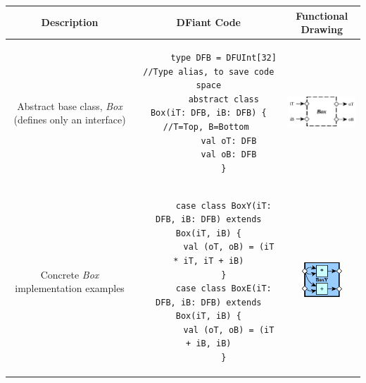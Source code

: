 \begin{table}[t]
  \label{tbl:Box}
  \begin{tabular}{|c|c|c|}
    \hline 
    \textbf{Description} & \textbf{DFiant Code} & \textbf{Functional Drawing} \\ 
    \hline
    \begin{minipage}{0.1\textwidth}
      \footnotesize
      \flushleft
      Abstract base class, \textit{Box} (defines only an interface)
    \end{minipage} 
    &
    \begin{minipage}{0.48\textwidth}
      \begin{verbatim}
      type DFB = DFUInt[32] //Type alias, to save code space
      abstract class Box(iT: DFB, iB: DFB) { //T=Top, B=Bottom 
        val oT: DFB
        val oB: DFB
      }
      \end{verbatim}
    \end{minipage} 
    &  
    \begin{minipage}[c][1.5cm]{0.34\textwidth}
      \centering
      \includegraphics[height=1.3cm]{graphics/Box.pdf}%
    \end{minipage} 
    \\ 
    \hline 
    \begin{minipage}{0.1\textwidth}
      \footnotesize
      \flushleft
      Concrete \textit{Box} implementation examples
    \end{minipage} 
    &
    \begin{minipage}{0.48\textwidth}
      \begin{verbatim}
      case class BoxY(iT: DFB, iB: DFB) extends Box(iT, iB) {
        val (oT, oB) = (iT * iT, iT + iB)
      }
      case class BoxE(iT: DFB, iB: DFB) extends Box(iT, iB) {
        val (oT, oB) = (iT + iB, iB)
      }
      \end{verbatim}
    \end{minipage} 
    &  
    \begin{minipage}[c][1.8cm]{0.34\textwidth}
      \centering
      \includegraphics[height=1.3cm]{graphics/BoxY.pdf}%

\end{minipage}
\end{tabular}
\end{table}
